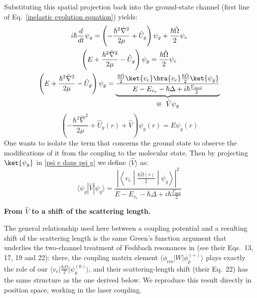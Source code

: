 Substituting this spatial projection back into the ground-state channel (first line of Eq.~\ref{inelastic evolution equation}) yields:
\begin{gather}
    i\hbar\frac{d}{dt}\psi_g = \left(-\frac{\hbar^2\hat{\nabla}^2}{2\mu}+\hat{U}_g\right)\psi_g +\frac{\hbar\hat{\Omega}}{2}\psi_e\\
    \left(E+\frac{\hbar^2\hat{\nabla}^2}{2\mu} - \hat{U}_g\right) \psi_g = \frac{\hbar\hat{\Omega}}{2} \psi_e\\
    \left(E+\frac{\hbar^2\hat{\nabla}^2}{2\mu} - \hat{U}_g\right) \psi_g =  \underbrace{\frac{\frac{\hbar\hat{\Omega}}{2}\ket{v_e}\bra{v_e}\frac{\hbar\hat{\Omega}}{2}\ket{\psi_g}}{E-E_{v_e} - \hbar\Delta + 
    i\hbar\frac{\Gamma_{\text{mol}}}{2}}}_{\displaystyle \equiv\ \hat{V}\psi_g}
\end{gather}
\begin{equation}
\left(-\frac{\hbar^2\hat{\nabla}^2}{2\mu} + \hat{U}_g(r) + \hat{V}\right)\psi_g(r) = E \psi_g(r)
\label{psi e dans psi g}
\end{equation}
One wants to isolate the term that concerns the ground state to observe the modifications of it from the coupling to the molecular state. Then by projecting $\ket{\psi_g}$ in \ref{psi e dans psi g} we define $\langle\hat{V}\rangle$ as:
\begin{equation}
\langle \psi_g | \hat{V} | \psi_g \rangle = \frac{\left| \left\langle v_e \middle| \frac{\hbar\hat{\Omega}(r)}{2} \middle| \psi_g \right\rangle \right|^2}{E - E_{v_e} - \hbar\Delta + 
i\hbar\frac{\Gamma_{\text{mol}}}{2}}
\label{V_opt}
\end{equation}

\textbf{From $\hat V$ to a shift of the scattering length.}

The general relationship used here between a coupling potential and a
resulting shift of the scattering length is the same Green's function
argument that underlies the two-channel treatment of Feshbach resonances in
\cite{goral_adiabatic_2004} (see their Eqs.~13, 17, 19 and 22): there, the
coupling matrix element $\langle\phi_{\text{res}}\vert W\vert\phi_p^{(+)}
\rangle$ plays exactly the role of our $\langle v_e\vert\frac{\hbar\Omega}{2}
\vert\psi_g^{(0)}\rangle$, and their scattering-length shift (their Eq.~22)
has the same structure as the one derived below. We reproduce this result
directly in position space, working in the laser coupling.

